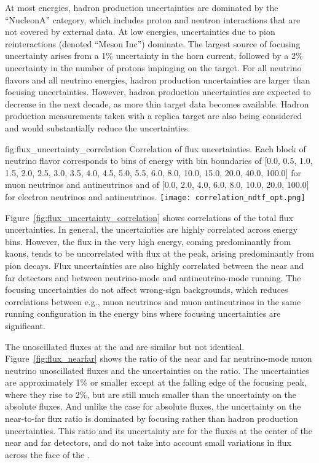 At most energies, hadron production uncertainties are dominated by the ``NucleonA'' category, which includes proton and neutron interactions that are not covered by external data.  At low energies, uncertainties due to pion reinteractions (denoted ``Meson Inc'') dominate.   The largest source of focusing uncertainty arises from a 1\% uncertainty in the horn current, followed by a 2\% %
uncertainty in the number of protons impinging on the target.   For all neutrino flavors and all neutrino energies, hadron production uncertainties are larger than focusing uncertainties.  However, hadron production uncertainties are expected to decrease in the next decade, as more thin target data becomes available.  Hadron production measurements taken with a replica target are also being considered and would substantially reduce the uncertainties.  

\begin{dunefigure}{fig:flux_uncertainty_correlation}
{Correlation of flux uncertainties.  Each block of neutrino flavor corresponds to bins of energy with bin boundaries of [0.0, 0.5, 1.0, 1.5, 2.0, 2.5, 3.0, 3.5, 4.0, 4.5, 5.0, 5.5, 6.0, 8.0, 10.0, 15.0, 20.0, 40.0, 100.0] for muon neutrinos and antineutrinos and of [0.0, 2.0, 4.0, 6.0, 8.0, 10.0, 20.0, 100.0] for electron neutrinos and antineutrinos. }
    \texttt{[image: correlation\_ndtf\_opt.png]}\end{dunefigure}

Figure~\ref{fig:flux_uncertainty_correlation} shows correlations of the total flux uncertainties.  In general, the uncertainties are highly correlated across energy bins. However, the flux in the very high energy, coming predominantly from kaons, tends to be uncorrelated with flux at the peak, %
arising predominantly from pion decays.  Flux uncertainties are also highly correlated between the near and far detectors and between neutrino-mode and antineutrino-mode running.  The focusing uncertainties do not affect wrong-sign backgrounds, which reduces correlations between e.g., muon neutrinos and muon antineutrinos in the same running configuration in the energy bins where focusing uncertainties are significant.    

The unoscillated fluxes at the  and  are similar but not identical. Figure~\ref{fig:flux_nearfar} shows the ratio of the near and far neutrino-mode muon neutrino unoscillated fluxes %
and the uncertainties on the ratio.  The uncertainties are approximately 1\% or smaller except at the falling edge of the focusing peak, where they rise to 2\%, but are still much smaller than the uncertainty on the absolute fluxes.    And unlike the case for absolute fluxes, the uncertainty on the near-to-far flux ratio is dominated by focusing rather than hadron production uncertainties.  This ratio and its uncertainty are for the fluxes at the center of the near and far detectors,
and do not take into account small variations in flux across the face of the .     

